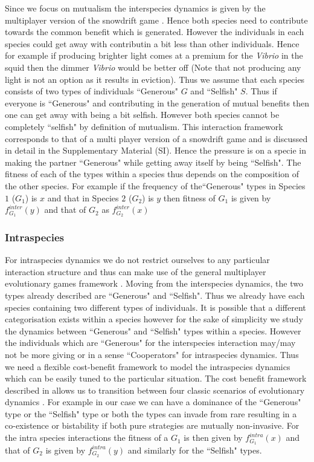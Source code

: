 \documentclass[12pt]{article}
\begin{document}
Since we focus on mutualism the interspecies dynamics is given by the multiplayer version of the snowdrift game \citep{bergstrom:PNAS:2003,souza:JTB:2009,gokhale:PRSB:2012}.
Hence both species need to contribute towards the common benefit which is generated.
However the individuals in each species could get away with contributin a bit less than other individuals.
Hence for example if producing brighter light comes at a premium for the \textit{Vibrio} in the squid then the dimmer \textit{Vibrio} would be better off (Note that not producing any light is not an option as it results in eviction).
Thus we assume that each species consists of two types of individuals ``Generous" $G$ and ``Selfish" $S$. 
Thus if everyone is ``Generous" and contributing in the generation of mutual benefits then one can get away with being a bit selfish. However both species cannot be completely ``selfish" by definition of mutualism.
This interaction framework corresponds to that of a multi player version of a snowdrift game and is discussed in detail in the Supplementary Material (SI).
Hence the pressure is on a specie in making the partner ``Generous" while getting away itself by being ``Selfish".
The fitness of each of the types within a species thus depends on the composition of the other species.
For example if the frequency of the``Generous" types in Species $1$ ($G_1$) is $x$ and that in Species $2$ ($G_2$) is $y$ then fitness of $G_1$  is given by $f^{inter}_{G_1} (y)$ and that of $G_2$ as $f^{inter}_{G_2} (x)$

\subsubsection{Intraspecies}

For intraspecies dynamics we do not restrict ourselves to any particular interaction structure and thus can make use of the general multiplayer evolutionary games framework \citep{gokhale:PNAS:2010,gokhale:DGAA:2014}.
Moving from the interspecies dynamics, the two types already described are ``Generous" and ``Selfish".
Thus we already have each species containing two different types of individuals.
It is possible that a different categorisation exists within a species however for the sake of simplicity we study the dynamics between ``Generous" and ``Selfish" types within a species.
However the individuals which are ``Generous" for the interspecies interaction may/may not be more giving or in a sense ``Cooperators" for intraspecies dynamics.
Thus we need a flexible cost-benefit framework to model the intraspecies dynamics which can be easily tuned to the particular situation.
The cost benefit framework described in \citep{eshel:AmNat:1988,hauert:JTB:2006a}
 allows us to transition between four classic scenarios of evolutionary dynamics \citep{nowak:Science:2004}.
For example in our case we can have a dominance of the ``Generous" type or the ``Selfish" type or both the types can invade from rare resulting in a co-existence or bistability if both pure strategies are mutually non-invasive.
For the intra species interactions the fitness of a $G_1$ is then given by $f^{intra}_{G_1} (x)$ and that of $G_2$ is given by $f^{intra}_{G_2} (y)$ and similarly for the ``Selfish" types.
\end{document}
